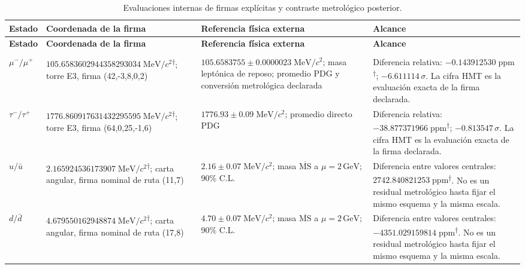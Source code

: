 \begingroup
\setlength{\tabcolsep}{4.5pt}
\renewcommand{\arraystretch}{1.28}
\begin{longtable}{@{}>{\raggedright\arraybackslash}p{}>{\raggedright\arraybackslash}p{}>{\raggedright\arraybackslash}p{}>{\raggedright\arraybackslash}p{}@{}}
\caption{Evaluaciones internas de firmas explícitas y contraste metrológico posterior.}\label{tab:masas-evaluaciones-firmas-explicitas}\\
\toprule
\textbf{Estado} & \textbf{Coordenada de la firma} & \textbf{Referencia física externa} & \textbf{Alcance} \\
\midrule
\endfirsthead
\toprule
\textbf{Estado} & \textbf{Coordenada de la firma} & \textbf{Referencia física externa} & \textbf{Alcance} \\
\midrule
\endhead
\midrule
\multicolumn{4}{r}{\footnotesize Continúa en la página siguiente.}\\
\endfoot
\bottomrule
\endlastfoot
$\mu^-/\mu^+$ & $105.658360\allowbreak{}294435\allowbreak{}829303\allowbreak{}4\;\mathrm{MeV}/c^2$\textsuperscript{\(\dagger\)}; torre E3, firma (42,-3,8,0,2) & $105.6583755\pm0.0000023\;\mathrm{MeV}/c^2$; masa leptónica de reposo; promedio PDG y conversión metrológica declarada & Diferencia relativa: $-0.143912\allowbreak{}530\;\mathrm{ppm}$\textsuperscript{\(\dagger\)}; $-6.611114\,\sigma$. La cifra HMT es la evaluación exacta de la firma declarada. \\
$\tau^-/\tau^+$ & $1776.860917\allowbreak{}631432\allowbreak{}295595\;\mathrm{MeV}/c^2$\textsuperscript{\(\dagger\)}; torre E3, firma (64,0,25,-1,6) & $1776.93\pm0.09\;\mathrm{MeV}/c^2$; promedio directo PDG & Diferencia relativa: $-38.877371\allowbreak{}966\;\mathrm{ppm}$\textsuperscript{\(\dagger\)}; $-0.813547\,\sigma$. La cifra HMT es la evaluación exacta de la firma declarada. \\
$u/\bar u$ & $2.165924\allowbreak{}536173\allowbreak{}907\;\mathrm{MeV}/c^2$\textsuperscript{\(\dagger\)}; carta angular, firma nominal de ruta (11,7) & $2.16\pm0.07\;\mathrm{MeV}/c^2$; masa $\overline{\mathrm{MS}}$ a $\mu=2\,\mathrm{GeV}$; 90\% C.L. & Diferencia entre valores centrales: $2742.840821\allowbreak{}253\;\mathrm{ppm}$\textsuperscript{\(\dagger\)}. No es un residual metrológico hasta fijar el mismo esquema y la misma escala. \\
$d/\bar d$ & $4.679550\allowbreak{}162948\allowbreak{}874\;\mathrm{MeV}/c^2$\textsuperscript{\(\dagger\)}; carta angular, firma nominal de ruta (17,8) & $4.70\pm0.07\;\mathrm{MeV}/c^2$; masa $\overline{\mathrm{MS}}$ a $\mu=2\,\mathrm{GeV}$; 90\% C.L. & Diferencia entre valores centrales: $-4351.029159\allowbreak{}814\;\mathrm{ppm}$\textsuperscript{\(\dagger\)}. No es un residual metrológico hasta fijar el mismo esquema y la misma escala. \\

\end{longtable}
